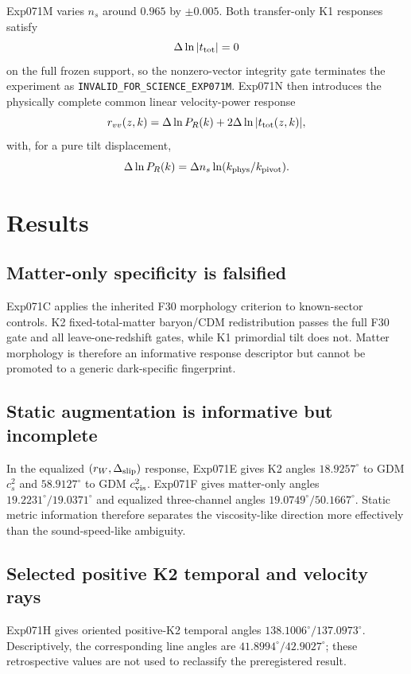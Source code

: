 \documentclass[11pt]{article}
\newcommand{\ttot}{t_{\rm tot}}
\newcommand{\dln}{\Delta\ln}
\begin{document}
Exp071M varies $n_s$ around $0.965$ by $\pm0.005$. Both transfer-only K1 responses satisfy
\begin{equation}
\dln|\ttot|=0
\end{equation}
on the full frozen support, so the nonzero-vector integrity gate terminates the experiment as \texttt{INVALID\_FOR\_SCIENCE\_EXP071M}. Exp071N then introduces the physically complete common linear velocity-power response
\begin{equation}
r_{vv}(z,k)=\dln P_R(k)+2\dln|\ttot(z,k)|,
\end{equation}
with, for a pure tilt displacement,
\begin{equation}
\dln P_R(k)=\Delta n_s\ln(k_{\rm phys}/k_{\rm pivot}).
\end{equation}



\section{Results}
\subsection{Matter-only specificity is falsified}
Exp071C applies the inherited F30 morphology criterion to known-sector controls. K2 fixed-total-matter baryon/CDM redistribution passes the full F30 gate and all leave-one-redshift gates, while K1 primordial tilt does not. Matter morphology is therefore an informative response descriptor but cannot be promoted to a generic dark-specific fingerprint.

\subsection{Static augmentation is informative but incomplete}
In the equalized $(r_W,\Delta_{\rm slip})$ response, Exp071E gives K2 angles $18.9257^\circ$ to GDM $c_s^2$ and $58.9127^\circ$ to GDM $c_{\rm vis}^2$. Exp071F gives matter-only angles $19.2231^\circ/19.0371^\circ$ and equalized three-channel angles $19.0749^\circ/50.1667^\circ$. Static metric information therefore separates the viscosity-like direction more effectively than the sound-speed-like ambiguity.

\subsection{Selected positive K2 temporal and velocity rays}
Exp071H gives oriented positive-K2 temporal angles $138.1006^\circ/137.0973^\circ$. Descriptively, the corresponding line angles are $41.8994^\circ/42.9027^\circ$; these retrospective values are not used to reclassify the preregistered result.
\end{document}
